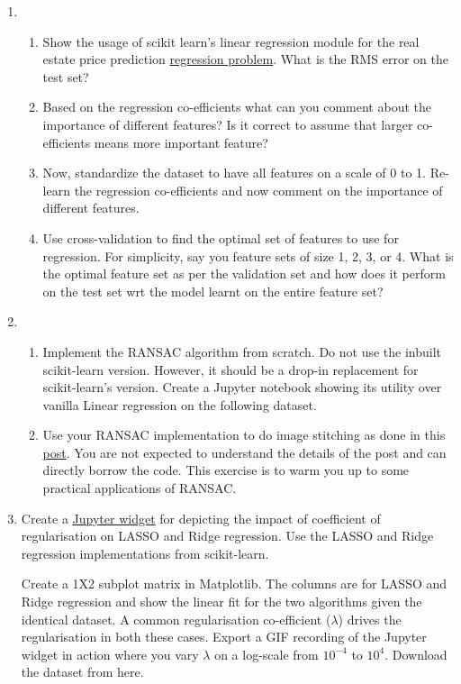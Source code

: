 \documentclass[colorlinks,linkcolor=true]{article}
\begin{document}
\begin{enumerate}
	
	\item 
\begin{enumerate}
	\item 	Show the usage of scikit learn's linear regression module for the real estate price prediction \href{https://archive.ics.uci.edu/ml/datasets/Real+estate+valuation+data+set}{regression problem}.  What is the RMS error on the test set? 
	\item Based on the regression co-efficients what can you comment about the importance of different features? Is it correct to assume that larger co-efficients means more important feature?
	\item Now, standardize the dataset to have all features on a scale of 0 to 1. Re-learn the regression co-efficients and now comment on the importance of different features.
	\item Use cross-validation to find the optimal set of features to use for regression. For simplicity, say you feature sets of size 1, 2, 3, or 4. What is the optimal feature set as per the validation set and how does it perform on the test set wrt the model learnt on the entire feature set?
	
\end{enumerate}

\item \begin{enumerate}
	\item Implement the RANSAC algorithm from scratch. Do not use the inbuilt scikit-learn version. However, it should be a drop-in replacement for scikit-learn's version. Create a Jupyter notebook showing its utility over vanilla Linear regression on the following dataset.
	\item Use your RANSAC implementation to do image stitching as done in this \href{https://www.pyimagesearch.com/2016/01/11/opencv-panorama-stitching/}{post}. You are not expected to understand the details of the post and can directly borrow the code. This exercise is to warm you up to some practical applications of RANSAC.
\end{enumerate}

\item Create a \href{https://ipywidgets.readthedocs.io/en/stable/examples/Widget\%20Basics.html}{Jupyter widget} for depicting the impact of coefficient of regularisation on LASSO and Ridge regression. Use the LASSO and Ridge regression implementations from scikit-learn.

Create a 1X2 subplot matrix in Matplotlib. The columns are for LASSO and Ridge regression and show the linear fit for the two algorithms given the identical dataset. A common regularisation co-efficient ($\lambda$) drives the regularisation in both these cases. Export a GIF recording of the Jupyter widget in action where you vary $\lambda$ on a log-scale from $10^{-4}$ to $10^{4}$. Download the dataset from here.


\end{enumerate}
\end{document}
